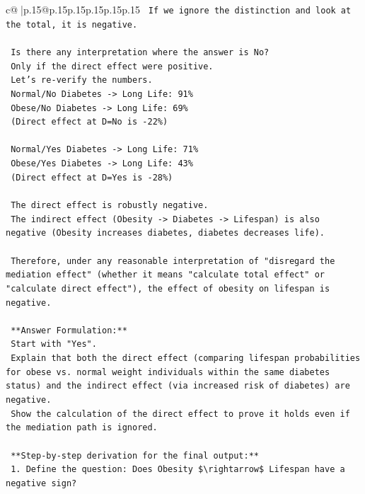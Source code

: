 \documentclass{article}
\begin{document}
{\begin{supertabular}{c@{$\;$}|p{.15\linewidth}@{}p{.15\linewidth}p{.15\linewidth}p{.15\linewidth}p{.15\linewidth}p{.15\linewidth}}
{{{\texttt{    If we ignore the distinction and look at the total, it is negative.} \\
\\ 
\texttt{    Is there any interpretation where the answer is No?} \\
\texttt{    Only if the direct effect were positive.} \\
\texttt{    Let's re{-}verify the numbers.} \\
\texttt{    Normal/No Diabetes {-}> Long Life: 91\%} \\
\texttt{    Obese/No Diabetes {-}> Long Life: 69\%} \\
\texttt{    (Direct effect at D=No is {-}22\%)} \\
\\ 
\texttt{    Normal/Yes Diabetes {-}> Long Life: 71\%} \\
\texttt{    Obese/Yes Diabetes {-}> Long Life: 43\%} \\
\texttt{    (Direct effect at D=Yes is {-}28\%)} \\
\\ 
\texttt{    The direct effect is robustly negative.} \\
\texttt{    The indirect effect (Obesity {-}> Diabetes {-}> Lifespan) is also negative (Obesity increases diabetes, diabetes decreases life).} \\
\\ 
\texttt{    Therefore, under any reasonable interpretation of "disregard the mediation effect" (whether it means "calculate total effect" or "calculate direct effect"), the effect of obesity on lifespan is negative.} \\
\\ 
\texttt{    **Answer Formulation:**} \\
\texttt{    Start with "Yes".} \\
\texttt{    Explain that both the direct effect (comparing lifespan probabilities for obese vs. normal weight individuals within the same diabetes status) and the indirect effect (via increased risk of diabetes) are negative.} \\
\texttt{    Show the calculation of the direct effect to prove it holds even if the mediation path is ignored.} \\
\\ 
\texttt{    **Step{-}by{-}step derivation for the final output:**} \\
\texttt{    1.  Define the question: Does Obesity \$\textbackslash{}rightarrow\$ Lifespan have a negative sign?} \\
}}}
\end{supertabular}}
\end{document}
